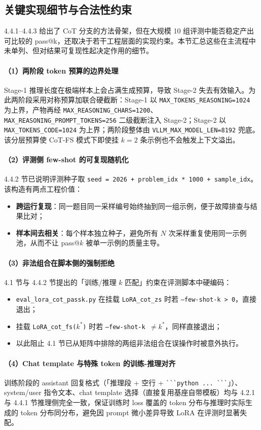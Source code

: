 \subsection{关键实现细节与合法性约束}

4.4.1--4.4.3 给出了 CoT 分支的方法骨架，但在大规模 10 组评测中能否稳定产出可比较的 pass@k，还取决于若干工程层面的实现约束。本节汇总这些在主流程中未单列、但对结果可复现性起决定作用的细节。

\paragraph{（1）两阶段 token 预算的边界处理}
Stage-1 推理长度在极端样本上会占满生成预算，导致 Stage-2 失去有效输入。为此两阶段采用对称预算加联合硬截断：Stage-1 以 \texttt{MAX\_TOKENS\_REASONING=1024} 为上界，产物再经 \texttt{MAX\_REASONING\_CHARS=1200}、\texttt{MAX\_REASONING\_PROMPT\_TOKENS=256} 二级截断注入 Stage-2；Stage-2 以 \texttt{MAX\_TOKENS\_CODE=1024} 为上界；两阶段整体由 \texttt{VLLM\_MAX\_MODEL\_LEN=8192} 兜底。该分层预算使 CoT-FS 模式下即使挂 $k{=}2$ 条示例也不会触发上下文溢出。

\paragraph{（2）评测侧 few-shot 的可复现随机化}
4.4.2 节已说明评测种子取 \texttt{seed = 2026 + problem\_idx * 1000 + sample\_idx}。该构造有两点工程价值：
\begin{itemize}
    \item \textbf{跨运行复现}：同一题目同一采样编号始终抽到同一组示例，便于故障排查与结果比对；
    \item \textbf{样本间去相关}：每个样本独立种子，避免所有 $N$ 次采样重复使用同一示例池，从而不让 pass@$k$ 被单一示例的质量主导。
\end{itemize}

\paragraph{（3）非法组合在脚本侧的强制拒绝}
4.1 节与 4.4.2 节提出的「训练/推理 $k$ 匹配」约束在评测脚本中硬编码：
\begin{itemize}
    \item \texttt{eval\_lora\_cot\_passk.py} 在挂载 \texttt{LoRA\_cot\_zs} 时若 \texttt{--few-shot-k > 0}，直接退出；
    \item 挂载 \texttt{LoRA\_cot\_fs($k^\ast$)} 时若 \texttt{--few-shot-k $\ne k^\ast$}，同样直接退出；
    \item 以此阻止 4.1 节已从矩阵中排除的两组非法组合在误操作时被意外执行。
\end{itemize}

\paragraph{（4）Chat template 与特殊 token 的训练-推理对齐}
训练阶段的 assistant 回复格式（「推理段 + 空行 + \verb|```python ... ```|」）、system/user 指令文本、chat template 选择（直接复用基座自带模板）均与 4.2.1 与 4.4.1 节推理侧完全一致，保证训练时 loss 覆盖的 token 分布与推理时实际生成的 token 分布同分布，避免因 prompt 微小差异导致 LoRA 在评测时显著失配。

